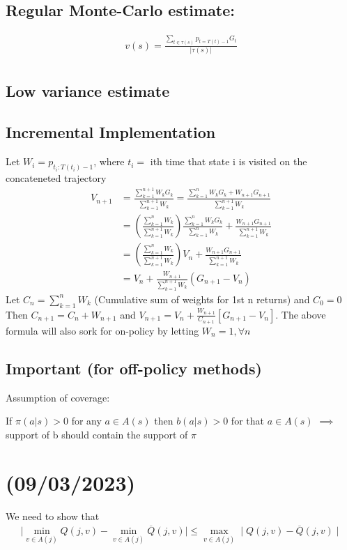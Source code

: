 \documentclass[11pt]{article}
\begin{document}
\subsection{Regular Monte-Carlo estimate:}
\label{sec:org4621df8}
\begin{align*}
v(s) = \frac{\sum_{t \in \tau(s)} p_{t=T(t)-1}G_t}{|\tau(s)|} \\
\end{align*}
\subsection{Low variance estimate}
\label{sec:orgebea683}
\subsection{Incremental Implementation}
\label{sec:orga9200f5}

Let \(W_i = p_{t_i: T(t_i)-1}\), where \(t_i =\) ith time that state i is visited on the concateneted trajectory
\begin{align*}
V_{n+1} &= \frac{\sum_{k=1}^{n+1} W_k G_k}{\sum_{k=1}^{n+1} W_k}
         = \frac{\sum_{k=1}^n W_k G_k + W_{n+1}G_{n+1}}{\sum_{k=1}^{n+1} W_k} \\
        &= \left( \frac{\sum_{k=1}^n W_k}{\sum_{k=1}^{n+1} W_k} \right) \frac{\sum_{k=1}^n W_k G_k}{\sum_{k=1}^n W_k} +
            \frac{W_{n+1} G_{n+1}}{\sum_{k=1}^{n+1} W_k} \\
        &= \left( \frac{\sum_{k=1}^n W_k}{\sum_{k=1}^{n+1} W_k} \right) V_n + \frac{W_{n+1} G_{n+1}}{\sum_{k=1}^{n+1} W_k} \\
        &= V_n + \frac{W_{n+1}}{\sum_{k=1}^{n+1} W_k} \left( G_{n+1} - V_n \right)
\end{align*}
Let \(C_n = \sum_{k=1}^n W_k\) (Cumulative sum of weights for 1st n returns) and \(C_0 = 0\)
Then \(C_{n+1} = C_n + W_{n+1}\) and \(V_{n+1} = V_n + \frac{W_{n+1}}{C_{n+1}} [G_{n+1} - V_n]\).
The above formula will also sork for on-policy by letting \(W_n = 1, \forall n\)

\subsection{Important (for off-policy methods)}
\label{sec:org8ecc582}
Assumption of coverage:

If \(\pi(a|s) > 0\) for any \(a \in A(s)\)
then \(b(a|s) > 0\) for that \(a \in A(s)\)
\(\implies\) support of b should contain the support of \(\pi\)

\section{(09/03/2023)}
\label{sec:orgd14711d}
We need to show that
\begin{align*}
\mid \min_{v \in A(j)} Q(j, v) - \min_{v \in A(j)} \overline{Q}(j, v) \mid
\leq \max_{v \in A(j)} \mid Q(j, v) - \overline{Q}(j, v) \mid \\
\end{align*}
\end{document}
